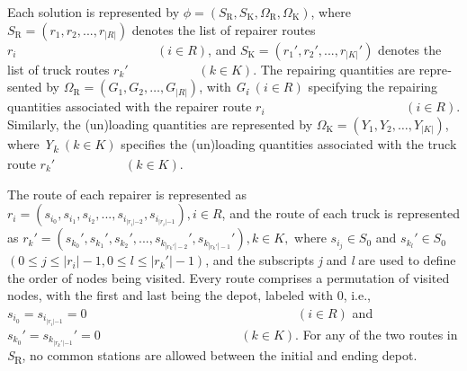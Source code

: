 \documentclass[
  english,
]{article}
\begin{document}
\begin{otherlanguage}{english}
\protect{}\label{p0265}
Each solution is represented by
\(\phi = \left( {S_{\text{R}},S_{\text{K}},\Omega_{\text{R}},\Omega_{\text{K}}} \right)\), where
\(S_{\text{R}} = \left( {r_{1},r_{2},...,r_{|R|}} \right)\) denotes the list of repairer routes
\(r_{i}\mspace{100mu}\mspace{100mu}\left( {i \in R} \right)\), and
\(S_{\text{K}} = \left( {r_{1}',r_{2}',...,r_{|K|}'} \right)\) denotes the list of truck routes
\(r_{k}'\mspace{100mu}\left( {k \in K} \right)\). The repairing quantities are represented by
\(\Omega_{\text{R}} = \left( {G_{1},G_{2},\ldots,G_{|R|}} \right)\), with \emph{G\textsubscript{i}}
\(\left( {i \in R} \right)\) specifying the repairing quantities associated with the repairer route
\(r_{i}\mspace{100mu}\mspace{100mu}\left( {i \in R} \right)\). Similarly, the (un)loading quantities
are represented by \(\Omega_{\text{K}} = \left( {Y_{1},Y_{2},\ldots,Y_{|K|}} \right)\), where
\emph{Y\textsubscript{k}} \(\left( {k \in K} \right)\) specifies the (un)loading quantities
associated with the truck route \(r_{k}'\mspace{100mu}\left( {k \in K} \right)\).

\protect{}\label{p0270}
The route of each repairer is represented as
\(r_{i} = \left( {s_{i_{0}},s_{i_{1}},s_{i_{2}},...,s_{i_{|r_{i}{| - 2}}},s_{i_{|r_{i}{| - 1}}}} \right),i \in R\),
and the route of each truck is represented as
\(r_{k}' = \left( {s_{k_{0}}',s_{k_{1}}',s_{k_{2}}',...,s_{k_{{|r_{k}'|} - 2}}',s_{k_{{|r_{k}'|} - 1}}'} \right),k \in K,\)
where \(s_{i_{j}} \in S_{0}\) and \(s_{k_{l}}' \in S_{0}\)
\(\left( {0 \leq j \leq \left| r_{i} \right| - 1,0 \leq l \leq \left| r_{k}' \right| - 1} \right)\),
and the subscripts \emph{j} and \emph{l} are used to define the order of nodes being visited. Every
route comprises a permutation of visited nodes, with the first and last being the depot, labeled
with 0, i.e.,
\(s_{i_{0}} = s_{i_{|r_{i}{| - 1}}} = 0\mspace{100mu}\mspace{100mu}\mspace{100mu}\left( {i \in R} \right)\)
and
\(s_{k_{0}}' = s_{k_{|r_{k}'{| - 1}}}' = 0\mspace{100mu}\mspace{100mu}\left( {k \in K} \right)\).
For any of the two routes in \emph{S}\textsubscript{R}, no common stations are allowed between the
initial and ending depot.


\end{otherlanguage}
\end{document}
